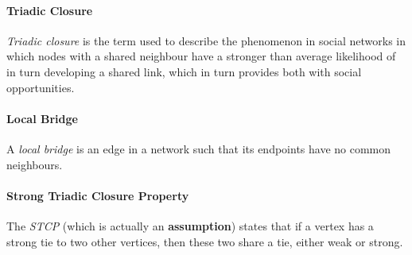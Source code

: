 \documentclass[english]{panikzettel}
\begin{document}
\paragraph{Triadic Closure}
\textit{Triadic closure} is the term used to describe the phenomenon in social networks in which nodes with a shared neighbour have a stronger than average likelihood of in turn developing a shared link, which in turn provides both with social opportunities.

\paragraph{Local Bridge}
A \textit{local bridge} is an edge in a network such that its endpoints have no common neighbours.

\paragraph{Strong Triadic Closure Property} The \textit{STCP} (which is actually an \textbf{assumption}) states that if a vertex has a strong tie to two other vertices, then these two share a tie, either weak or strong.
\end{document}

